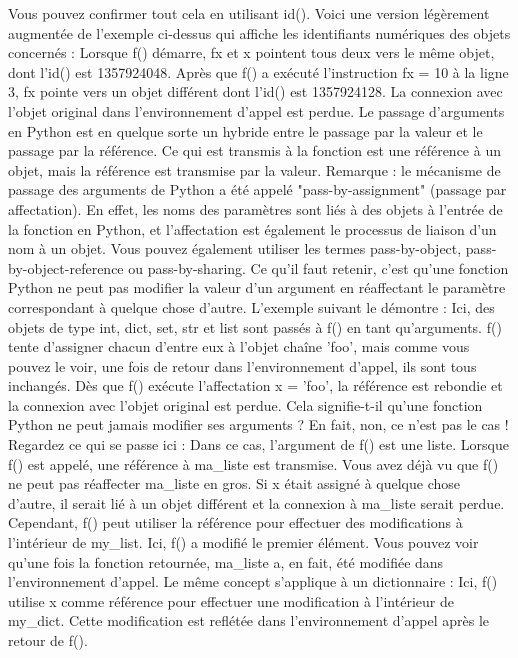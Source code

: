 Vous pouvez confirmer tout cela en utilisant id().  Voici une version légèrement augmentée de l'exemple ci-dessus qui affiche les identifiants numériques des objets concernés :
Lorsque f() démarre, fx et x pointent tous deux vers le même objet, dont l'id() est 1357924048.  Après que f() a exécuté l'instruction fx = 10 à la ligne 3, fx pointe vers un objet différent dont l'id() est 1357924128.  La connexion avec l'objet original dans l'environnement d'appel est perdue.
Le passage d'arguments en Python est en quelque sorte un hybride entre le passage par la valeur et le passage par la référence.  Ce qui est transmis à la fonction est une référence à un objet, mais la référence est transmise par la valeur.
Remarque : le mécanisme de passage des arguments de Python a été appelé "pass-by-assignment" (passage par affectation). En effet, les noms des paramètres sont liés à des objets à l'entrée de la fonction en Python, et l'affectation est également le processus de liaison d'un nom à un objet. Vous pouvez également utiliser les termes pass-by-object, pass-by-object-reference ou pass-by-sharing.
Ce qu'il faut retenir, c'est qu'une fonction Python ne peut pas modifier la valeur d'un argument en réaffectant le paramètre correspondant à quelque chose d'autre. L'exemple suivant le démontre :
Ici, des objets de type int, dict, set, str et list sont passés à f() en tant qu'arguments. f() tente d'assigner chacun d'entre eux à l'objet chaîne 'foo', mais comme vous pouvez le voir, une fois de retour dans l'environnement d'appel, ils sont tous inchangés.  Dès que f() exécute l'affectation x = 'foo', la référence est rebondie et la connexion avec l'objet original est perdue.
Cela signifie-t-il qu'une fonction Python ne peut jamais modifier ses arguments ?  En fait, non, ce n'est pas le cas !  Regardez ce qui se passe ici :
Dans ce cas, l'argument de f() est une liste.  Lorsque f() est appelé, une référence à ma_liste est transmise.  Vous avez déjà vu que f() ne peut pas réaffecter ma_liste en gros. Si x était assigné à quelque chose d'autre, il serait lié à un objet différent et la connexion à ma_liste serait perdue.
Cependant, f() peut utiliser la référence pour effectuer des modifications à l'intérieur de my_list.  Ici, f() a modifié le premier élément.  Vous pouvez voir qu'une fois la fonction retournée, ma_liste a, en fait, été modifiée dans l'environnement d'appel. Le même concept s'applique à un dictionnaire :
Ici, f() utilise x comme référence pour effectuer une modification à l'intérieur de my_dict.  Cette modification est reflétée dans l'environnement d'appel après le retour de f().
